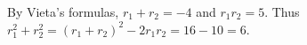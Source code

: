 By Vieta's formulas, $r_1+r_2=-4$ and $r_1r_2=5$. Thus $r_1^2+r_2^2=(r_1+r_2)^2-2r_1r_2=16-10=\boxed6$.
